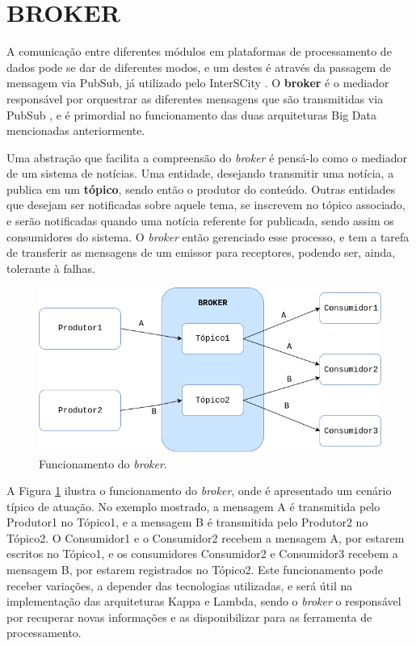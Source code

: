 \section{BROKER}

A comunicação entre diferentes módulos em plataformas de processamento de dados
pode se dar de diferentes modos, e um destes é através da passagem
de mensagem via PubSub, já utilizado pelo InterSCity \cite{delesposte2017}.
O \textbf{broker} é o mediador responsável por orquestrar as diferentes
mensagens que são transmitidas via PubSub \cite{marz2015}, e é primordial no
funcionamento das duas arquiteturas Big Data mencionadas anteriormente.

Uma abstração que facilita a compreensão do \textit{broker} é pensá-lo como o
mediador de um sistema de notícias. Uma entidade, desejando transmitir
uma notícia, a publica em um \textbf{tópico}, sendo então o produtor do
conteúdo. Outras entidades que desejam ser notificadas sobre aquele tema, se
inscrevem no tópico associado, e serão notificadas quando uma notícia referente
for publicada, sendo assim os consumidores do sistema. O \textit{broker} então
gerenciado esse processo, e tem a tarefa de transferir as mensagens de um
emissor para receptores, podendo ser, ainda, tolerante à falhas.

\begin{figure}
  \centering
    \includegraphics[scale=0.5]{figuras/broker.png}
    \caption{Funcionamento do \textit{broker}.}
  \label{fig:broker}
\end{figure}

A Figura \ref{fig:broker} ilustra o funcionamento do \textit{broker}, onde é
apresentado um cenário típico de atuação. No exemplo mostrado, a mensagem A
é transmitida pelo Produtor1 no Tópico1, e a mensagem B é transmitida pelo
Produtor2 no Tópico2. O Consumidor1 e o Consumidor2 recebem a mensagem A, por
estarem escritos no Tópico1, e os consumidores Consumidor2 e Consumidor3
recebem a mensagem B, por estarem registrados no Tópico2. Este funcionamento
pode receber variações, a depender das tecnologias utilizadas, e será útil
na implementação das arquiteturas Kappa e Lambda, sendo o
\textit{broker} o responsável por recuperar novas informações e as
disponibilizar para as ferramenta de processamento.

